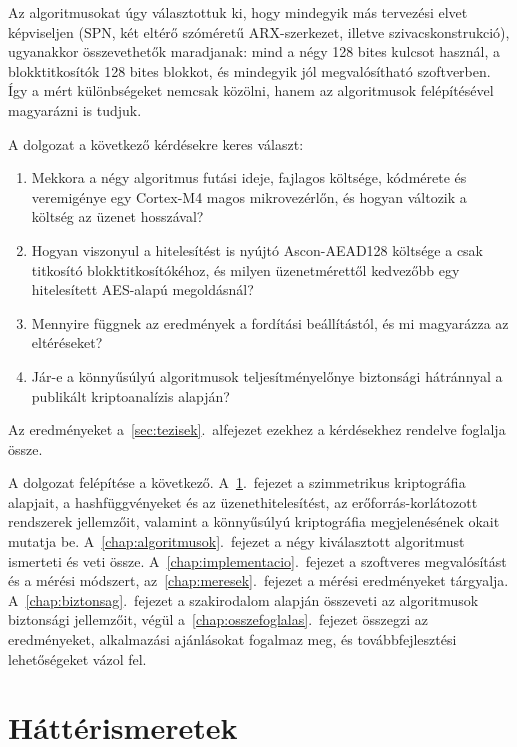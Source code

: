 \documentclass[a4paper,12pt]{report}
\theoremstyle{definition}
\theoremstyle{remark}
\begin{document}
Az algoritmusokat úgy választottuk ki, hogy mindegyik más tervezési elvet képviseljen (SPN, két eltérő szóméretű ARX-szerkezet, illetve szivacskonstrukció), ugyanakkor összevethetők maradjanak: mind a négy 128 bites kulcsot használ, a blokktitkosítók 128 bites blokkot, és mindegyik jól megvalósítható szoftverben. Így a mért különbségeket nemcsak közölni, hanem az algoritmusok felépítésével magyarázni is tudjuk.

A dolgozat a következő kérdésekre keres választ:
\begin{enumerate}
	\item[K1.] Mekkora a négy algoritmus futási ideje, fajlagos költsége, kódmérete és veremigénye egy Cortex-M4 magos mikrovezérlőn, és hogyan változik a költség az üzenet hosszával?
	\item[K2.] Hogyan viszonyul a hitelesítést is nyújtó Ascon-AEAD128 költsége a csak titkosító blokktitkosítókéhoz, és milyen üzenetmérettől kedvezőbb egy hitelesített AES-alapú megoldásnál?
	\item[K3.] Mennyire függnek az eredmények a fordítási beállítástól, és mi magyarázza az eltéréseket?
	\item[K4.] Jár-e a könnyűsúlyú algoritmusok teljesítményelőnye biztonsági hátránnyal a publikált kriptoanalízis alapján?
\end{enumerate}
Az eredményeket a~\ref{sec:tezisek}.~alfejezet ezekhez a kérdésekhez rendelve foglalja össze.

A dolgozat felépítése a következő. A~\ref{chap:hatter}.~fejezet a szimmetrikus kriptográfia alapjait, a hashfüggvényeket és az üzenethitelesítést, az erőforrás-korlátozott rendszerek jellemzőit, valamint a könnyűsúlyú kriptográfia megjelenésének okait mutatja be. A~\ref{chap:algoritmusok}.~fejezet a négy kiválasztott algoritmust ismerteti és veti össze. A~\ref{chap:implementacio}.~fejezet a szoftveres megvalósítást és a mérési módszert, az~\ref{chap:meresek}.~fejezet a mérési eredményeket tárgyalja. A~\ref{chap:biztonsag}.~fejezet a szakirodalom alapján összeveti az algoritmusok biztonsági jellemzőit, végül a~\ref{chap:osszefoglalas}.~fejezet összegzi az eredményeket, alkalmazási ajánlásokat fogalmaz meg, és továbbfejlesztési lehetőségeket vázol fel.

\chapter{Háttérismeretek}\label{chap:hatter}
\end{document}
